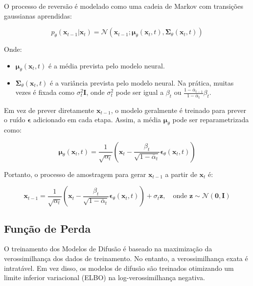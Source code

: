 \documentclass{article}
\begin{document}
O processo de reversão é modelado como uma cadeia de Markov com transições gaussianas aprendidas:

\begin{equation}
    p_\theta(\mathbf{x}_{t-1} | \mathbf{x}_t) = \mathcal{N}(\mathbf{x}_{t-1}; \boldsymbol{\mu}_\theta(\mathbf{x}_t, t), \boldsymbol{\Sigma}_\theta(\mathbf{x}_t, t))
\end{equation}

Onde:
\begin{itemize}
    \item $\boldsymbol{\mu}_\theta(\mathbf{x}_t, t)$ é a média prevista pelo modelo neural.
    \item $\boldsymbol{\Sigma}_\theta(\mathbf{x}_t, t)$ é a variância prevista pelo modelo neural. Na prática, muitas vezes é fixada como $\sigma_t^2 \mathbf{I}$, onde $\sigma_t^2$ pode ser igual a $\beta_t$ ou $\frac{1 - \bar{\alpha}_{t-1}}{1 - \bar{\alpha}_t} \beta_t$.
\end{itemize}

Em vez de prever diretamente $\mathbf{x}_{t-1}$, o modelo geralmente é treinado para prever o ruído $\boldsymbol{\epsilon}$ adicionado em cada etapa. Assim, a média $\boldsymbol{\mu}_\theta$ pode ser reparametrizada como:

\begin{equation}
    \boldsymbol{\mu}_\theta(\mathbf{x}_t, t) = \frac{1}{\sqrt{\alpha_t}} \left( \mathbf{x}_t - \frac{\beta_t}{\sqrt{1 - \bar{\alpha}_t}} \boldsymbol{\epsilon}_\theta(\mathbf{x}_t, t) \right)
\end{equation}

Portanto, o processo de amostragem para gerar $\mathbf{x}_{t-1}$ a partir de $\mathbf{x}_t$ é:

\begin{equation}
    \mathbf{x}_{t-1} = \frac{1}{\sqrt{\alpha_t}} \left( \mathbf{x}_t - \frac{\beta_t}{\sqrt{1 - \bar{\alpha}_t}} \boldsymbol{\epsilon}_\theta(\mathbf{x}_t, t) \right) + \sigma_t \mathbf{z}, \quad \text{onde } \mathbf{z} \sim \mathcal{N}(\mathbf{0}, \mathbf{I})
\end{equation}

\subsection{Função de Perda}

O treinamento dos Modelos de Difusão é baseado na maximização da verossimilhança dos dados de treinamento. No entanto, a verossimilhança exata é intratável. Em vez disso, os modelos de difusão são treinados otimizando um limite inferior variacional (ELBO) na log-verossimilhança negativa.
\end{document}
